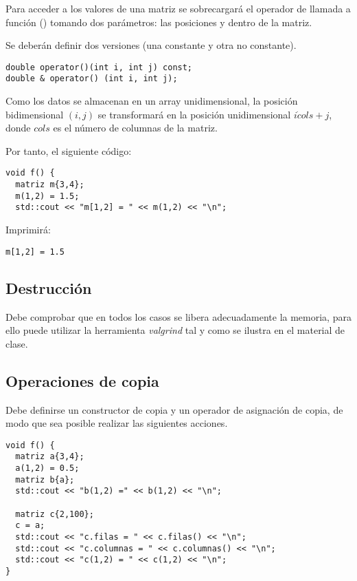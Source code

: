 Para acceder a los valores de una matriz se sobrecargará el operador de llamada
a función (\cppid{()}) tomando dos parámetros: las posiciones
 y  dentro de la matriz.

Se deberán definir dos versiones (una constante y otra no constante).

\begin{lstlisting}
double operator()(int i, int j) const;
double & operator() (int i, int j);
\end{lstlisting}

Como los datos se almacenan en un array unidimensional, la posición
bidimensional $(i,j)$ se transformará en la posición unidimensional $i \dot cols
+ j$, donde $cols$ es el número de columnas de la matriz.

Por tanto, el siguiente código:

\begin{lstlisting}
void f() {
  matriz m{3,4};
  m(1,2) = 1.5;
  std::cout << "m[1,2] = " << m(1,2) << "\n";
\end{lstlisting}

Imprimirá:

\begin{lstlisting}[style=terminal]
m[1,2] = 1.5
\end{lstlisting}

\subsection{Destrucción}

Debe comprobar que en todos los casos se libera adecuadamente la memoria,
para ello puede utilizar la herramienta \emph{valgrind} tal y como se ilustra en
el material de clase.

\subsection{Operaciones de copia}

Debe definirse un constructor de copia y un operador de asignación de copia, de
modo que sea posible realizar las siguientes acciones.

\begin{lstlisting}
void f() {
  matriz a{3,4};
  a(1,2) = 0.5;
  matriz b{a};
  std::cout << "b(1,2) =" << b(1,2) << "\n";

  matriz c{2,100};
  c = a;
  std::cout << "c.filas = " << c.filas() << "\n";
  std::cout << "c.columnas = " << c.columnas() << "\n";
  std::cout << "c(1,2) = " << c(1,2) << "\n";
}
\end{lstlisting}

